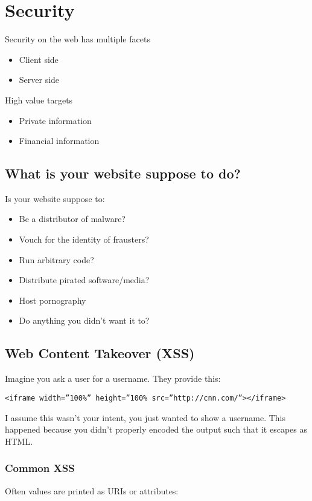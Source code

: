 \documentclass[../CMPUT-404-Notes.tex]{subfiles}
\begin{document}
\chapter{Security}
Security on the web has multiple facets
\begin{itemize}
    \item Client side
    \item Server side
\end{itemize}
High value targets
\begin{itemize}
    \item Private information
    \item Financial information
\end{itemize}

\section{What is your website suppose to do?}
Is your website suppose to:
\begin{itemize}
    \item Be a distributor of malware?
    \item Vouch for the identity of frausters?
    \item Run arbitrary code?
    \item Distribute pirated software/media?
    \item Host pornography
    \item Do anything you didn't want it to?
\end{itemize}

\section{Web Content Takeover (XSS)}
Imagine you ask a user for a username.
They provide this:
\begin{verbatim}
<iframe width=”100%” height=”100% src=”http://cnn.com/”></iframe>
\end{verbatim}
I assume this wasn't your intent, you just wanted to show a username.
This happened because you didn't properly encoded the output such that it escapes as HTML.

\subsection{Common XSS}
Often values are printed as URIs or attributes:
\end{document}
